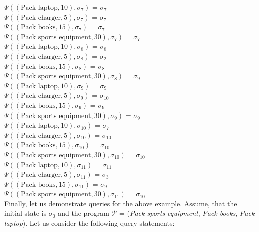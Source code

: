 \documentclass[a4paper]{article}
\begin{document}
$\Psi((\text{Pack laptop},10),\sigma_7)$ = $\sigma_7$ \\[0.1\baselineskip] 
$\Psi((\text{Pack charger},5),\sigma_7)$ = $\sigma_7$ \\[0.1\baselineskip] 
$\Psi((\text{Pack books},15),\sigma_7)$ = $\sigma_7$ \\[0.1\baselineskip] 
$\Psi((\text{Pack sports equipment},30),\sigma_7)$ = $\sigma_7$ \\[0.7\baselineskip]
$\Psi((\text{Pack laptop},10),\sigma_8)$ = $\sigma_8$ \\[0.1\baselineskip] 
$\Psi((\text{Pack charger},5),\sigma_8)$ = $\sigma_2$ \\[0.1\baselineskip] 
$\Psi((\text{Pack books},15),\sigma_8)$ = $\sigma_8$ \\[0.1\baselineskip] 
$\Psi((\text{Pack sports equipment},30),\sigma_8)$ = $\sigma_9$ \\[0.7\baselineskip]
$\Psi((\text{Pack laptop},10),\sigma_9)$ = $\sigma_9$ \\[0.1\baselineskip] 
$\Psi((\text{Pack charger},5),\sigma_9)$ = $\sigma_{10}$ \\[0.1\baselineskip] 
$\Psi((\text{Pack books},15),\sigma_9)$ = $\sigma_9$ \\[0.1\baselineskip] 
$\Psi((\text{Pack sports equipment},30),\sigma_9)$ = $\sigma_9$ \\[0.7\baselineskip]
$\Psi((\text{Pack laptop},10),\sigma_{10})$ = $\sigma_7$ \\[0.1\baselineskip] 
$\Psi((\text{Pack charger},5),\sigma_{10})$ = $\sigma_{10}$ \\[0.1\baselineskip] 
$\Psi((\text{Pack books},15),\sigma_{10})$ = $\sigma_{10}$ \\[0.1\baselineskip] 
$\Psi((\text{Pack sports equipment},30),\sigma_{10})$ = $\sigma_{10}$ \\[0.7\baselineskip]
$\Psi((\text{Pack laptop},10),\sigma_{11})$ = $\sigma_{11}$ \\[0.1\baselineskip] 
$\Psi((\text{Pack charger},5),\sigma_{11})$ = $\sigma_3$ \\[0.1\baselineskip] 
$\Psi((\text{Pack books},15),\sigma_{11})$ = $\sigma_9$ \\[0.1\baselineskip] 
$\Psi((\text{Pack sports equipment},30),\sigma_{11})$ = $\sigma_{10}$ \\[0.7\baselineskip]
Finally, let us demonstrate queries for the above example. Assume, that the initial state is $\sigma_0$ and the program $\mathcal{P}$ = (\textit{Pack sports equipment}, \textit{Pack books}, \textit{Pack laptop}). Let us consider the following query statements:
\end{document}
